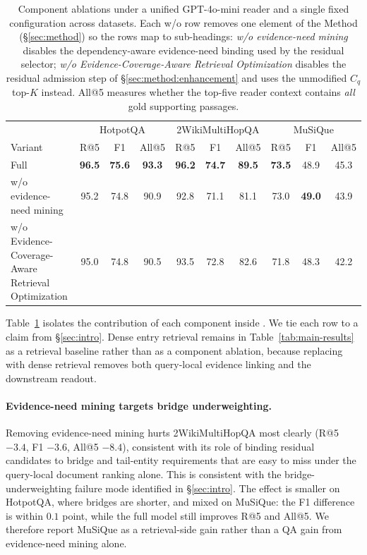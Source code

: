 \begin{table}[t]
\centering
\small
\setlength{\tabcolsep}{4pt}
\begin{tabular}{lccc ccc ccc}
\toprule
& \multicolumn{3}{c}{HotpotQA} &
\multicolumn{3}{c}{2WikiMultiHopQA} &
\multicolumn{3}{c}{MuSiQue} \\
\cmidrule(lr){2-4}\cmidrule(lr){5-7}\cmidrule(lr){8-10}
Variant & R@5 & F1 & All@5 & R@5 & F1 & All@5 & R@5 & F1 & All@5 \\
\midrule
Full \methodname{} & \textbf{96.5} & \textbf{75.6} & \textbf{93.3}
& \textbf{96.2} & \textbf{74.7} & \textbf{89.5}
& \textbf{73.5} & 48.9 & 45.3 \\
\midrule
w/o evidence-need mining                      & 95.2 & 74.8 & 90.9 & 92.8 & 71.1 & 81.1 & 73.0 & \textbf{49.0} & 43.9 \\
w/o Evidence-Coverage-Aware Retrieval Optimization
                                                & 95.0 & 74.8 & 90.5 & 93.5 & 72.8 & 82.6 & 71.8 & 48.3 & 42.2 \\
\bottomrule
\end{tabular}
\caption{Component ablations under a unified GPT-4o-mini reader and
a single fixed configuration across datasets. Each w/o row removes
one element of the Method (\S\ref{sec:method}) so the rows map to
sub-headings: \emph{w/o evidence-need mining} disables the
dependency-aware evidence-need binding used by the residual selector;
\emph{w/o Evidence-Coverage-Aware Retrieval Optimization} disables
the residual admission step of \S\ref{sec:method:enhancement} and uses
the unmodified $C_q$ top-$K$ instead. All@5 measures whether the
top-five reader context contains \emph{all} gold supporting passages.}
\label{tab:ablation}
\end{table}

Table~\ref{tab:ablation} isolates the contribution of each
component inside \methodname{}. We tie each row to a claim from
\S\ref{sec:intro}. Dense entry retrieval remains in
Table~\ref{tab:main-results} as a retrieval baseline rather than as a
component ablation, because replacing \methodname{} with dense retrieval
removes both query-local evidence linking and the downstream readout.

\paragraph{Evidence-need mining targets bridge underweighting.}
Removing evidence-need mining hurts 2WikiMultiHopQA most clearly
(R@5 $-3.4$, F1 $-3.6$, All@5 $-8.4$), consistent with its role of
binding residual candidates to bridge and tail-entity requirements
that are easy to miss under the query-local document ranking alone.
This is consistent with the bridge-underweighting failure mode identified in
\S\ref{sec:intro}. The effect is smaller on HotpotQA, where bridges
are shorter, and mixed on MuSiQue: the F1 difference is within
$0.1$ point, while the full model still improves R@5 and All@5. We
therefore report MuSiQue as a retrieval-side gain rather than a QA
gain from evidence-need mining alone.

